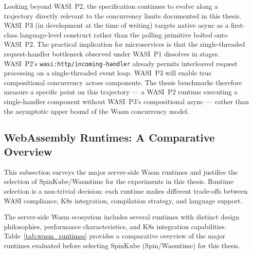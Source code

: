 \begin{sloppypar}
Looking beyond \acs{WASI}~P2, the specification continues to evolve along a trajectory directly relevant to the concurrency limits documented in this thesis. \acs{WASI}~P3 (in development at the time of writing) targets native async as a first-class language-level construct rather than the polling primitive bolted onto \acs{WASI}~P2. The practical implication for microservices is that the single-threaded request-handler bottleneck observed under \acs{WASI}~P1 dissolves in stages. \acs{WASI}~P2's \texttt{wasi:http/incoming-handler} already permits interleaved request processing on a single-threaded event loop. \acs{WASI}~P3 will enable true compositional concurrency across components. The thesis benchmarks therefore measure a specific point on this trajectory --- a \acs{WASI}~P2 runtime executing a single-handler component without \acs{WASI}~P3's compositional async --- rather than the asymptotic upper bound of the \acs{Wasm} concurrency model.
\end{sloppypar}

\subsection{WebAssembly Runtimes: A Comparative Overview}
\label{sec:runtime_landscape}
\begin{sloppypar}
This subsection surveys the major server-side \acs{Wasm} runtimes and justifies the selection of SpinKube/Wasmtime for the experiments in this thesis. Runtime selection is a non-trivial decision: each runtime makes different trade-offs between \acs{WASI} compliance, \acs{K8s} integration, compilation strategy, and language support.
\end{sloppypar}

The server-side \acs{Wasm} ecosystem includes several runtimes with distinct design philosophies, performance characteristics, and \acs{K8s} integration capabilities. Table~\ref{tab:wasm_runtimes} provides a comparative overview of the major runtimes evaluated before selecting SpinKube (Spin/Wasmtime) for this thesis.

